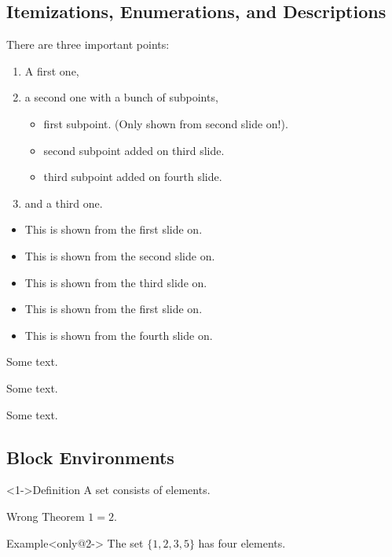 \documentclass{beamer}
\begin{document}
\subsection{Itemizations, Enumerations, and Descriptions}
\begin{frame}
  There are three important points:
  \begin{enumerate}
  \item<1-> A first one,
  \item<2-> a second one with a bunch of subpoints,
    \begin{itemize}
    \item first subpoint. (Only shown from second slide on!).
    \item<3-> second subpoint added on third slide.
    \item<4-> third subpoint added on fourth slide.
    \end{itemize}
  \item<5-> and a third one.
  \end{enumerate}
\end{frame}
\begin{frame}
\begin{itemize}[<+->]
\item This is shown from the first slide on.
\item This is shown from the second slide on.
\item This is shown from the third slide on.
\item<1-> This is shown from the first slide on.
\item This is shown from the fourth slide on.
\end{itemize}
\end{frame}
\begin{frame}
\begin{description}
\item[short] Some text.
\item[longest label] Some text.
\item[long label] Some text.
\end{description}
\end{frame}
\subsection{Block Environments}
\begin{frame}
  \begin{block}<1->{Definition}
      A \alert{set} consists of elements.
  \end{block}
  \begin{alertblock}{Wrong Theorem}
      $1=2$.
  \end{alertblock}
  \begin{exampleblock}{Example}<only@2->
      The set $\{1,2,3,5\}$ has four elements.
  \end{exampleblock}
\end{frame}
\end{document}
